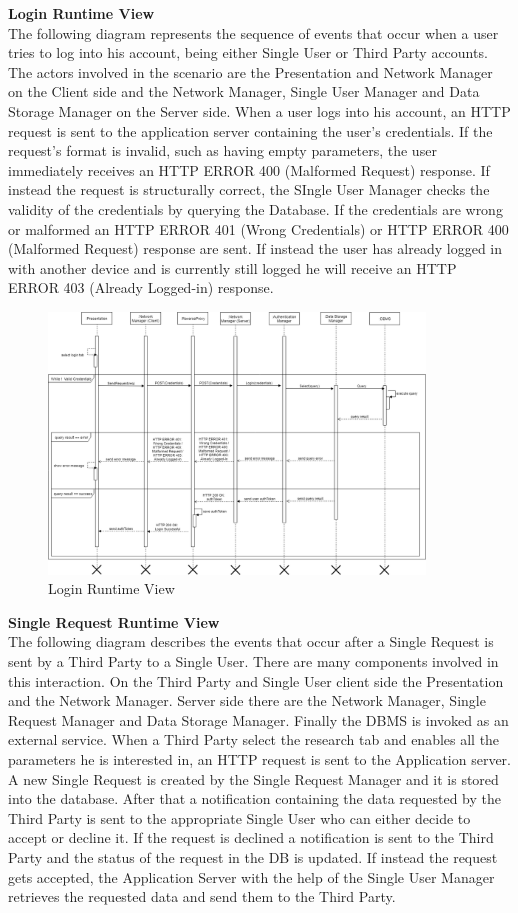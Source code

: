 \documentclass[titlepage]{article}
\begin{document}
{\bf Login Runtime View }\\ 
The following diagram represents the sequence of events that occur when a user tries to log into his account, being either Single User or Third Party accounts. The actors involved in the scenario are the Presentation and Network Manager on the Client side and the Network Manager, Single User Manager and Data Storage Manager on the Server side. 
When a user logs into his account, an HTTP request is sent to the application server containing the user’s credentials. If the request’s format is invalid, such as having empty parameters, the user immediately receives an HTTP ERROR 400 (Malformed Request) response. If instead the request is structurally correct, the SIngle User Manager checks the validity of the credentials by querying the Database. If the credentials are wrong or malformed an HTTP ERROR 401 (Wrong Credentials) or HTTP ERROR 400 (Malformed Request) response are sent. If instead the user has already logged in with another device and is currently still logged he will receive an HTTP ERROR 403 (Already Logged-in) response.

\begin{figure}[H]
	\center
  	\includegraphics[width=10cm]{Login.png} %
  	\caption{Login Runtime View}
 	\label{fig:LOG}
\end{figure}


{\bf Single Request Runtime View }\\ 
The following diagram describes the events that occur after a Single Request is sent by a Third Party to a Single User. There are many components involved in this interaction. On the Third Party and Single User client side the Presentation and the Network Manager. Server side there are the Network Manager, Single Request Manager and Data Storage Manager. Finally the DBMS is invoked as an external service.
When a Third Party select the research tab and enables all the parameters he is interested in, an HTTP request is sent to the Application server. A new Single Request is created by the Single Request Manager and it is stored into the database. After that a notification containing the data requested by the Third Party is sent to the appropriate Single User who can either decide to accept or decline it. If the request is declined a notification is sent to the Third Party and the status of the request in the DB is updated. If instead the request gets accepted, the Application Server with the help of the Single User Manager retrieves the requested data and send them to the Third Party.
\end{document}
